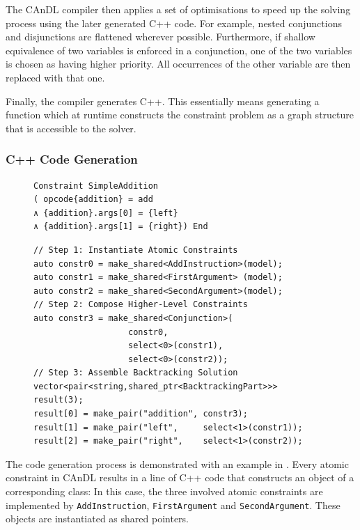     The CAnDL compiler then applies a set of optimisations to speed up the
    solving process using the later generated C++ code.
    For example, nested conjunctions and disjunctions are flattened wherever
    possible.
    Furthermore, if shallow equivalence of two variables is enforced in a
    conjunction, one of the two variables is chosen as having higher priority.
    All occurrences of the other variable are then replaced with that one.

    Finally, the compiler generates C++.
    This essentially means generating a function which at runtime constructs
    the constraint problem as a graph structure that is accessible to the
    solver.

\subsubsection{C++ Code Generation}

\begin{figure}[t]
\centering
\begin{lstlisting}[language=CAnDL]
Constraint SimpleAddition
( opcode{addition} = add
∧ {addition}.args[0] = {left}
∧ {addition}.args[1] = {right}) End
\end{lstlisting}
\begin{lstlisting}[language=MyCpp,label={fig:codegen},caption=
   {C++ code generation: The code is generated to first instantiate atomic
    constraints, then compose higher-level constructs and finally assemble a
    backtracking solution for the solver.}]
// Step 1: Instantiate Atomic Constraints
auto constr0 = make_shared<AddInstruction>(model);
auto constr1 = make_shared<FirstArgument> (model);
auto constr2 = make_shared<SecondArgument>(model);
// Step 2: Compose Higher-Level Constraints
auto constr3 = make_shared<Conjunction>(
                   constr0,
                   select<0>(constr1),
                   select<0>(constr2));
// Step 3: Assemble Backtracking Solution
vector<pair<string,shared_ptr<BacktrackingPart>>> result(3);
result[0] = make_pair("addition", constr3);
result[1] = make_pair("left",     select<1>(constr1));
result[2] = make_pair("right",    select<1>(constr2));
\end{lstlisting}
\end{figure}

    The code generation process is demonstrated with an example in
    .
    Every atomic constraint in CAnDL results in a line of C++ code that
    constructs an object of a corresponding class:
    In this case, the three involved atomic constraints are implemented by
    \texttt{AddInstruction}, \texttt{FirstArgument} and \texttt{SecondArgument}.
    These objects are instantiated as shared pointers.

